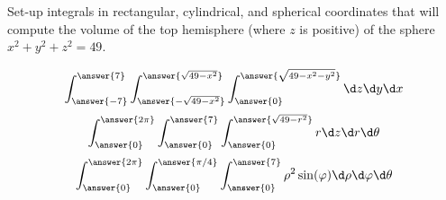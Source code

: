 \documentclass{ximera}
\author{Bart Snapp}
\begin{document}
\begin{exercise}
  Set-up integrals in rectangular, cylindrical, and spherical coordinates that
  will compute the volume of the top hemisphere (where $z$ is positive) of the sphere $x^2+y^2+z^2 = 49$.
  \begin{prompt}
  \[
  \int_{\answer{-7}}^{\answer{7}}\int_{\answer{-\sqrt{49-x^2}}}^{\answer{\sqrt{49-x^2}}}\int_{\answer{0}}^{\answer{\sqrt{49-x^2-y^2}}}\d z \d y \d x
  \]
  \[
  \int_{\answer{0}}^{\answer{2\pi}}\int_{\answer{0}}^{\answer{7}}\int_{\answer{0}}^{\answer{\sqrt{49-r^2}}}   r\d z \d r \d \theta
  \]
  \[
  \int_{\answer{0}}^{\answer{2\pi}}\int_{\answer{0}}^{\answer{\pi/4}}\int_{\answer{0}}^{\answer{7}}   \rho^2\sin(\varphi)\d \rho \d \varphi \d \theta
  \]
  \end{prompt}
\end{exercise}
\end{document}
